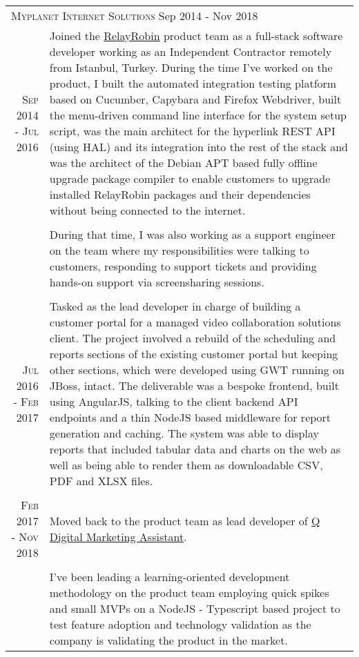 \documentclass[a4paper,10pt]{article}
\newcommand{\exptitle}[2]{
  \multicolumn{2}{l}{\textsc{#1} \footnotesize{#2}} \\
  \specialrule{.01em}{0.5em}{1em}
}
\begin{document}
\begin{longtable}{r|p{11cm}}
  \exptitle{Myplanet Internet Solutions}{Sep 2014 - Nov 2018}

  \textsc{Sep 2014 - Jul 2016}  & Joined the \href{http://relayrobin.com}{RelayRobin} product team as a full-stack software developer working as an Independent Contractor remotely from Istanbul, Turkey. During the time I've worked on the product, I built the automated integration testing platform based on Cucumber, Capybara and Firefox Webdriver, built the menu-driven command line interface for the system setup script, was the main architect for the hyperlink REST API (using HAL) and its integration into the rest of the stack and was the architect of the Debian APT based fully offline upgrade package compiler to enable customers to upgrade installed RelayRobin packages and their dependencies without being connected to the internet. \\
                                & \\
                                & During that time, I was also working as a support engineer on the team where my responsibilities were talking to customers, responding to support tickets and providing hands-on support via screensharing sessions. \\
  \multicolumn{2}{c}{} \\
  \textsc{Jul 2016 - Feb 2017}  & Tasked as the lead developer in charge of building a customer portal for a managed video collaboration solutions client. The project involved a rebuild of the scheduling and reports sections of the existing customer portal but keeping other sections, which were developed using GWT running on JBoss, intact. The deliverable was a bespoke frontend, built using AngularJS, talking to the client backend API endpoints and a thin NodeJS based middleware for report generation and caching. The system was able to display reports that included tabular data and charts on the web as well as being able to render them as downloadable CSV, PDF and XLSX files.  \\

  \multicolumn{2}{c}{} \\
  \textsc{Feb 2017 - Nov 2018}  & Moved back to the product team as lead developer of \href{http://askq.io/}{Q Digital Marketing Assistant}. \\
                                & \\
   & I've been leading a learning-oriented development methodology on the product team employing quick spikes and small MVPs on a NodeJS - Typescript based project to test feature adoption and technology validation as the company is validating the product in the market. \\


\end{longtable}
\end{document}
